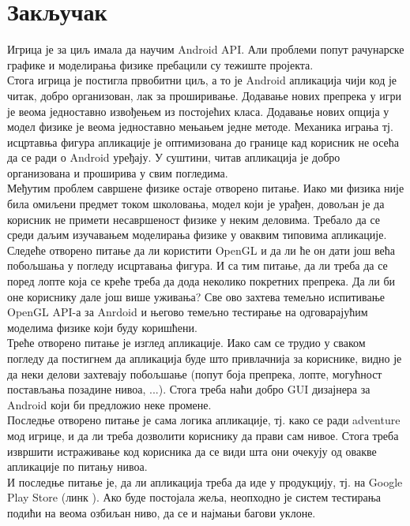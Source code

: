 \chapter{Закључак} \label{Conclusion}

Игрица је за циљ имала да научим Android API. Али проблеми попут рачунарске графике и моделирања физике пребацили су тежиште пројекта.  
\\ \indent Стога игрица је постигла првобитни циљ, а то је Android апликација чији код је читак, добро организован, лак за проширивање. Додавање нових препрека у игри је веома једноставно извођењем из постојећих класа. Додавање нових опција у модел физике је веома једноставно мењањем једне методе. Механика играња тј. исцртавња фигура апликације је оптимизована до границе кад корисник не осећа да се ради о Android уређају. У суштини, читав апликација је добро организована и проширива у свим погледима. 
\\ \indent Међутим проблем савршене физике остаје отворено питање. Иако ми физика није била омиљени предмет током школовања, модел који је урађен, довољан је да корисник не примети несавршеност физике у неким деловима. Требало да се среди даљим изучавањем моделирања физике у оваквим типовима апликације. 
\\ \indent Следеће отворено питање да ли користити OpenGL и да ли ће он дати још већа побољшања у погледу исцртавања фигура. И са тим питање, да ли треба да се поред лопте која се креће треба да дода неколико покретних препрека. Да ли би оне кориснику дале још више уживања? Све ово захтева темељно испитивање OpenGL API-а за Anrdoid и његово темељно тестирање на одговарајућим моделима физике који буду коришћени.
\\ \indent Треће отворено питање је изглед апликације. Иако сам се трудио у сваком погледу да постигнем да апликација буде што привлачнија за кориснике, видно је да неки делови захтевају побољшање (попут боја препрека, лопте, могућност постављања позадине нивоа, ...).  Стога треба наћи добро GUI дизајнера за Android који би предложио неке промене. 
\\ \indent Последње отворено питање је сама логика апликације, тј. како се ради adventure мод игрице, и да ли треба дозволити кориснику да прави сам нивое. Стога треба извршити истраживање код корисника да се види шта они очекују од овакве апликације по питању нивоа.
\\ \indent И последње питање је, да ли апликација треба да иде у продукцију, тј. на Google Play Store (линк \cite{GooglePlayStore}). Ако буде постојала жеља, неопходно је систем тестирања подићи на веома озбиљан ниво, да се и најмањи багови уклоне.